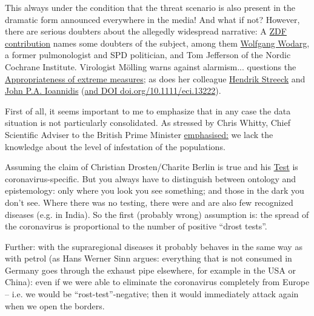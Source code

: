 \documentclass[%
 reprint,
 showpacs,
 showkeys,
 preprintnumbers,
 amsmath,amssymb,
 aps,
  pra,
  longbibliography,
 floatfix,
 ]{revtex4-1}
\begin{document}
This always under the condition that the threat scenario is also present in the dramatic form announced everywhere in the media!
And what if not?
However, there are serious doubters about the allegedly widespread narrative:
A \href{https://www.zdf.de/politik/frontal-21/corona-zwischen-panik-und-pandemie-100.html}{ZDF contribution}
names some doubters of the subject, among them \href{https://www.wodarg.com/}{Wolfgang Wodarg}, a former pulmonologist and SPD politician,
and Tom Jefferson of the Nordic Cochrane Institute.
Virologist M\"olling warns against alarmism...
questions the \href{https://www.youtube.com/watch?v=ycum0vtVwi4}{Appropriateness of extreme measures};
as does her colleague
\href{https://www.faz.net/aktuell/gesellschaft/gesundheit/coronavirus/neue-corona-symptome-entdeckt-virologe-hendrik-streeck-zum-virus-16681450.html?printPagedArticle=true#pageIndex_3}{Hendrik Streeck}
and
\href{https://www.statnews.com/2020/03/17/a-fiasco-in-the-making-as-the-coronavirus-pandemic-takes-hold-we-are-making-decisions-without-reliable-data/}{John P.A. Ioannidis}
(\href{https://doi.org/10.1111/eci.13222}{and DOI doi.org/10.1111/eci.13222}).

First of all, it seems important to me to emphasize that in any case the data situation is not particularly consolidated.
As stressed by Chris Whitty, Chief Scientific Adviser to the British Prime Minister \href{https://www.youtube.com/watch?v=cMtE1ppmkM0&feature=youtu.be&t=747}{emphasised:}
we lack the knowledge about the level of infestation of the populations.


Assuming the claim of Christian Drosten/Charite Berlin is true and his
\href{https://www.sueddeutsche.de/medien/corona-drosten-virologe-1.4843374}{Test} is coronavirus-specific.
But you always have to distinguish between ontology and epistemology: only where you look you see something; and those in the dark you don't see.
Where there was no testing, there were and are also few recognized diseases (e.g. in India).
So the first (probably wrong) assumption is: the spread of the coronavirus is proportional to the number of positive ``drost tests''.

Further: with the supraregional diseases it probably behaves in the same way as with petrol
(as Hans Werner Sinn argues: everything that is not consumed in Germany goes through the exhaust pipe elsewhere, for example in the USA or China):
even if we were able to eliminate the coronavirus completely from Europe -- i.e. we would be ``rost-test''-negative;
then it would immediately attack again when we open the borders.
\end{document}
